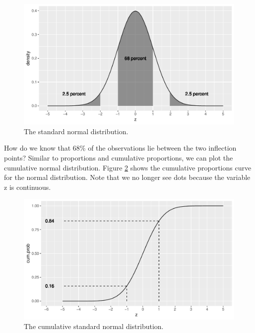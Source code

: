 \documentclass[]{book}\usepackage[]{graphicx}\usepackage[]{color}
\makeatletter
\def\maxwidth{ %
  \ifdim\Gin@nat@width>\linewidth
    \linewidth
  \else
    \Gin@nat@width
  \fi
}
\newenvironment{knitrout}{}{} %
\makeatother
\begin{document}
\begin{knitrout}
\color{fgcolor}\begin{figure}

{\centering \includegraphics[width=\maxwidth]{figure/normal_2-1} 

}

\caption[The standard normal distribution]{The standard normal distribution.}\label{fig:normal_2}
\end{figure}


\end{knitrout}

How do we know that 68\% of the observations lie between the two inflection points? Similar to proportions and cumulative proportions, we can plot the cumulative normal distribution. Figure \ref{fig:normal_3} shows the cumulative proportions curve for the normal distribution. Note that we no longer see dots because the variable z is continuous.

\begin{knitrout}
\color{fgcolor}\begin{figure}

{\centering \includegraphics[width=\maxwidth]{figure/normal_3-1} 

}

\caption[The cumulative standard normal distribution]{The cumulative standard normal distribution.}\label{fig:normal_3}
\end{figure}


\end{knitrout}
\end{document}
